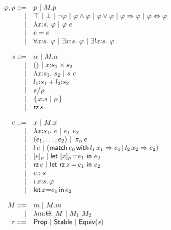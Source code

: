 \begin{figure}
	\[
	\begin{array}{rll}
		\ip,\ipp ::= 
		    & \iP\ |\ \iselect{\im}{\iP}\\
		  | & \itrue \ | \ \ifalse\ |\ \inot{\ip}\ |\ \iands{\ip}{\ip}\ |\ 
		       \iors{\ip}{\ip}\ | \ \iimply{\ip}{\ip}\ |\ \iiff{\ip}{\ip}\\
		  | & \ilambda{\ix}{\is}{\ip} \ |\ \iapp{\ip}{\ie}\\
		  | & \iequal{\ie}{\ie}\\
		  | & \iforall{\ix}{\is}{\ip} \ |\ 
		      \iexists{\ix}{\is}{\ip} \ |\
		      \iunique{\ix}{\is}{\ip}\\[10pt]
		
		\is ::= 
		    & \iS \ |\ \iselect{\im}{\iS}\\
		  | & ()\ |\ \iprod{\ix}{\is_1}{\is_2}\\
		  | & \ilambda{\ix}{\is_1}{\is_2}\ |\ 
		      \iapp{\is}{\ie}\\
		  | & \isum{\il_1}{\is_1}{\il_2}{\is_2}\\
		  | & \iquot{\is}{\ipp}\\
		  | & \isubset{\ix}{\is}{\ipp}\\
		  | & \irz{\is}\\[10pt] 
		
	
		\ie ::=
		    & \ix\ |\ \iselect{\im}{\ix}\\
		  | & \ilambda{\ix}{\is_1}{\ie}\ |\ 
		      \iapp{\ie_1}{\ie_2}\\
		  | & \ituple{\ie_1}{\ie_2} 
		      \ibar \iproj{\ie}{n}\\
		  | & \iinj{\il}{\ie} 
		      \ibar (\imatch{\ie_0}{\il_1}{\ix_1}{\ie_1}{\il_2}{\ix_2}{\ie_2})\\
		  | & \ieclass{\ie}{\ipp}
		      \ibar \ileteclass{\ix}{\ipp}{\ie_1}{\ie_2}\\
		  | & \irz{\ie}
		      \ibar \iletrz{\ix}{\ie_1}{\ie_2}\\
		  | & \iconstrain{\ie}{\is}\\
		  | & \ithe{\ix}{\is}{\ip}\\
		  | & \ilet{\ix}{\ie_1}{\ie_2}\\[10pt]
		
		\im ::= 
		    & \iM \ |\ \iselect{\im}{\iM}\\
		  | & \ilambda{\iM}{\ith}{\im}\ |\ 
		      \iapp{\im_1}{\im_2}\\
		
		\ipt ::=
		    & \iProp\ |\ \iStable\ |\ \iEquiv{\is}\\[10pt] 
		

\end{array}\]
\end{figure}
